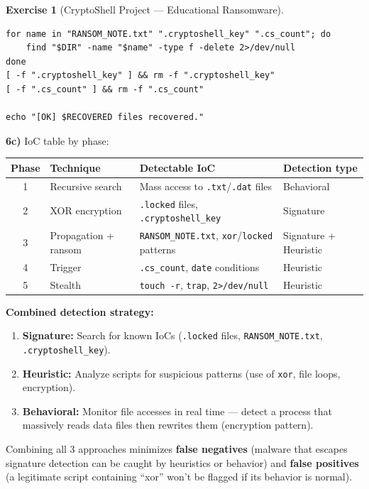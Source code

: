 \documentclass[a4paper,11pt]{article}
\theoremstyle{plain}
\theoremstyle{definition}
\newtheorem{exercice}{Exercise}
\begin{document}
\begin{exercice}[CryptoShell Project --- Educational Ransomware]
\begin{correction}
\begin{lstlisting}[title=recovery.sh (phase6\_recovery.sh)]
for name in "RANSOM_NOTE.txt" ".cryptoshell_key" ".cs_count"; do
    find "$DIR" -name "$name" -type f -delete 2>/dev/null
done
[ -f ".cryptoshell_key" ] && rm -f ".cryptoshell_key"
[ -f ".cs_count" ] && rm -f ".cs_count"

echo "[OK] $RECOVERED files recovered."
\end{lstlisting}

\textbf{6c)} IoC table by phase:

\begin{center}
\begin{tabular}{clp{4cm}l}
\toprule
\textbf{Phase} & \textbf{Technique} & \textbf{Detectable IoC} & \textbf{Detection type} \\
\midrule
1 & Recursive search & Mass access to \texttt{.txt}/\texttt{.dat} files & Behavioral \\
2 & XOR encryption & \texttt{.locked} files, \texttt{.cryptoshell\_key} & Signature \\
3 & Propagation + ransom & \texttt{RANSOM\_NOTE.txt}, \texttt{xor}/\texttt{locked} patterns & Signature + Heuristic \\
4 & Trigger & \texttt{.cs\_count}, \texttt{date} conditions & Heuristic \\
5 & Stealth & \texttt{touch -r}, \texttt{trap}, \texttt{2>/dev/null} & Heuristic \\
\bottomrule
\end{tabular}
\end{center}

\textbf{Combined detection strategy:}
\begin{enumerate}
    \item \textbf{Signature:} Search for known IoCs (\texttt{.locked} files, \texttt{RANSOM\_NOTE.txt}, \texttt{.cryptoshell\_key}).
    \item \textbf{Heuristic:} Analyze scripts for suspicious patterns (use of \texttt{xor}, file loops, encryption).
    \item \textbf{Behavioral:} Monitor file accesses in real time --- detect a process that massively reads data files then rewrites them (encryption pattern).
\end{enumerate}

Combining all 3 approaches minimizes \textbf{false negatives} (malware that escapes signature detection can be caught by heuristics or behavior) and \textbf{false positives} (a legitimate script containing ``xor'' won't be flagged if its behavior is normal).


\end{correction}
\end{exercice}
\end{document}
